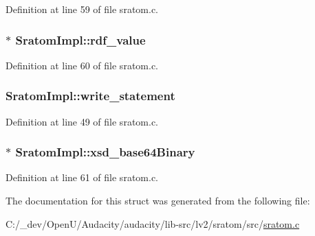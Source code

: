 Definition at line 59 of file sratom.\+c.

\subsubsection[{\texorpdfstring{rdf\+\_\+value}{rdf_value}}]{$\ast$ Sratom\+Impl\+::rdf\+\_\+value}\hypertarget{struct_sratom_impl_a3b6174585bc90862b6a1f0b10dc854a1}{}\label{struct_sratom_impl_a3b6174585bc90862b6a1f0b10dc854a1}


Definition at line 60 of file sratom.\+c.

\subsubsection[{\texorpdfstring{write\+\_\+statement}{write_statement}}]{ Sratom\+Impl\+::write\+\_\+statement}\hypertarget{struct_sratom_impl_ac3d75a232ce3fb342f80b074d4035b15}{}\label{struct_sratom_impl_ac3d75a232ce3fb342f80b074d4035b15}


Definition at line 49 of file sratom.\+c.

\subsubsection[{\texorpdfstring{xsd\+\_\+base64\+Binary}{xsd_base64Binary}}]{$\ast$ Sratom\+Impl\+::xsd\+\_\+base64\+Binary}\hypertarget{struct_sratom_impl_a462d8e3fe91bed3dfeebc00672eb7534}{}\label{struct_sratom_impl_a462d8e3fe91bed3dfeebc00672eb7534}


Definition at line 61 of file sratom.\+c.



The documentation for this struct was generated from the following file\+:\begin{DoxyCompactItemize}
\item 
C\+:/\+\_\+dev/\+Open\+U/\+Audacity/audacity/lib-\/src/lv2/sratom/src/\hyperlink{sratom_8c}{sratom.\+c}\end{DoxyCompactItemize}
